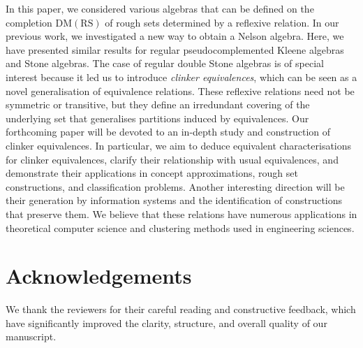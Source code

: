 \documentclass[11pt,a4paper]{amsart}
\theoremstyle{plain}
\theoremstyle{definition}
\theoremstyle{remark}
\numberwithin{equation}{section}
\begin{document}
In this paper, we considered various algebras that can be defined on 
the completion $\mathrm{DM(RS)}$ of rough sets determined by a 
reflexive relation. In our previous work, we investigated a new way to obtain a Nelson algebra. Here, we have presented similar results for regular pseudocomplemented Kleene algebras and Stone algebras. The case of regular double Stone algebras is of special interest because it led us to introduce \emph{clinker equivalences}, which can be seen as a novel generalisation of equivalence relations. These reflexive relations need not be symmetric or transitive, but they define an irredundant covering of the underlying set that generalises partitions induced by equivalences. Our forthcoming paper will be devoted to an in-depth study and construction of clinker equivalences. In particular, we aim to deduce equivalent characterisations for clinker equivalences, clarify their relationship with usual equivalences, and demonstrate their applications in concept approximations, rough set constructions, and classification problems. Another interesting direction will be their generation by information systems and the identification of constructions that preserve them. We believe that these relations have numerous applications in theoretical computer science and clustering methods used in engineering sciences.

\section*{Acknowledgements}
We thank the reviewers for their careful reading and constructive feedback, which have significantly improved the clarity, structure, and overall quality of our manuscript.


\printbibliography
\end{document}

